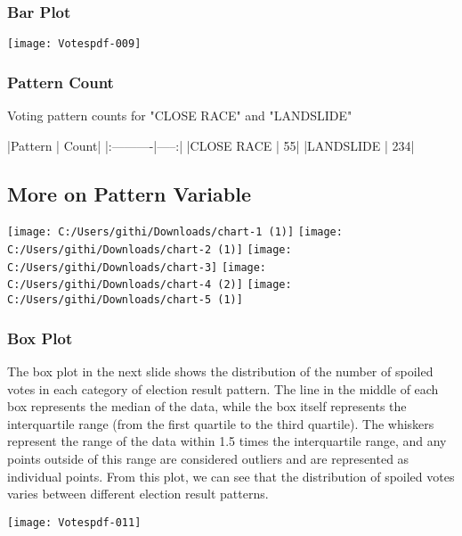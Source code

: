 \documentclass[fleqn,a4paper,12pt]{article}
\begin{document}
\subsubsection{Bar Plot}

\texttt{[image: Votespdf-009]}

\subsubsection{Pattern Count}

Voting pattern counts for "CLOSE RACE" and "LANDSLIDE" 
\begin{Schunk}
\begin{Soutput}
|Pattern    | Count|
|:----------|-----:|
|CLOSE RACE |    55|
|LANDSLIDE  |   234|
\end{Soutput}
\end{Schunk}

\subsection{More on Pattern Variable}


  \begin{center}
  \texttt{[image: C:/Users/githi/Downloads/chart-1 (1)]}
  \texttt{[image: C:/Users/githi/Downloads/chart-2 (1)]}
  \texttt{[image: C:/Users/githi/Downloads/chart-3]}
  \texttt{[image: C:/Users/githi/Downloads/chart-4 (2)]}
  \texttt{[image: C:/Users/githi/Downloads/chart-5 (1)]}
\end{center}

\subsubsection{Box Plot}

 
The box plot in the next slide shows the distribution of the number of spoiled votes in each category of election result pattern. The line in the middle of each box represents the median of the data, while the box itself represents the interquartile range (from the first quartile to the third quartile). The whiskers represent the range of the data within 1.5 times the interquartile range, and any points outside of this range are considered outliers and are represented as individual points.
From this plot, we can see that the distribution of spoiled votes varies between different election result patterns.
 

\texttt{[image: Votespdf-011]}
\end{document}

